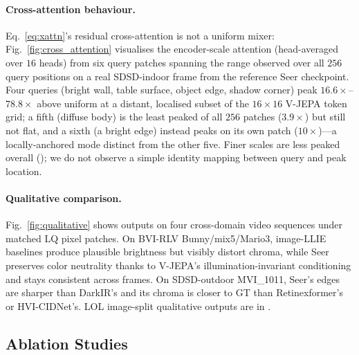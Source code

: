 \paragraph{Cross-attention behaviour.} Eq.~\eqref{eq:xattn}'s residual cross-attention is not a uniform mixer: Fig.~\ref{fig:cross_attention} visualises the encoder-scale attention (head-averaged over $16$ heads) from six query patches spanning the range observed over all $256$ query positions on a real SDSD-indoor frame from the reference Seer checkpoint. Four queries (bright wall, table surface, object edge, shadow corner) peak $16.6\times$--$78.8\times$ above uniform at a distant, localised subset of the $16{\times}16$ V-JEPA token grid; a fifth (diffuse body) is the least peaked of all $256$ patches ($3.9\times$) but still not flat, and a sixth (a bright edge) instead peaks on its own patch ($10\times$)---a locally-anchored mode distinct from the other five. Finer scales are less peaked overall (); we do not observe a simple identity mapping between query and peak location.

\paragraph{Qualitative comparison.} Fig.~\ref{fig:qualitative} shows outputs on four cross-domain video sequences under matched LQ pixel patches. On BVI-RLV Bunny/mix5/Mario3, image-LLIE baselines produce plausible brightness but visibly distort chroma, while Seer preserves color neutrality thanks to V-JEPA's illumination-invariant conditioning and stays consistent across frames. On SDSD-outdoor MVI\_1011, Seer's edges are sharper than DarkIR's and its chroma is closer to GT than Retinexformer's or HVI-CIDNet's. LOL image-split qualitative outputs are in .

\subsection{Ablation Studies}\label{sec:experiments:ablation}

